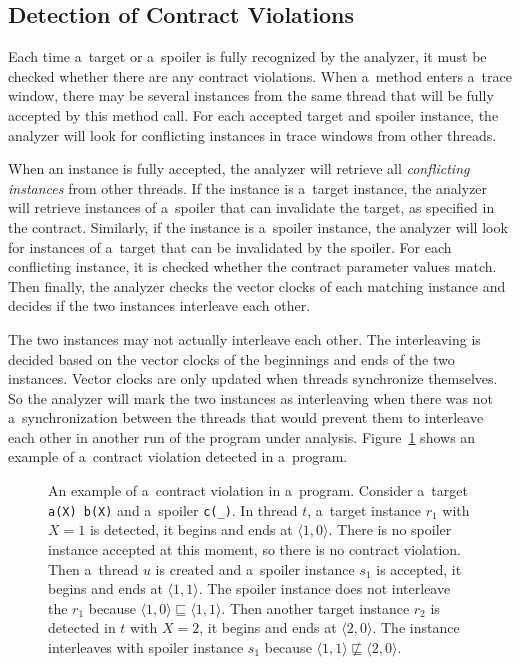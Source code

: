 \subsection{Detection of Contract Violations}
\label{violations}

Each time a~target or a~spoiler is fully recognized by the analyzer, it must be
checked whether there are any contract violations. When a~method enters a~trace
window, there may be several instances from the same thread that will be fully
accepted by this method call. For each accepted target and spoiler instance, the
analyzer will look for conflicting instances in trace windows from other
threads.

When an instance is fully accepted, the analyzer will retrieve all
\emph{conflicting instances} from other threads. If the instance is a~target
instance, the analyzer will retrieve instances of a~spoiler that can invalidate
the target, as specified in the contract. Similarly, if the instance is
a~spoiler instance, the analyzer will look for instances of a~target that can be
invalidated by the spoiler. For each conflicting instance, it is checked whether
the contract parameter values match. Then finally, the analyzer checks the
vector clocks of each matching instance and decides if the two instances
interleave each other.

The two instances may not actually interleave each other. The interleaving is
decided based on the vector clocks of the beginnings and ends of the two
instances. Vector clocks are only updated when threads synchronize themselves.
So the analyzer will mark the two instances as interleaving when there was not
a~synchronization between the threads that would prevent them to interleave each
other in another run of the program under analysis.
Figure~\ref{detectionExample} shows an example of a~contract violation detected
in a~program.

\begin{figure}[hbt]
    \begin{center}
        \label{detectionExample}
        
        \caption{An example of a~contract violation in a~program. Consider
        a~target \texttt{a(X) b(X)} and a~spoiler \texttt{c(\_)}. In thread $t$,
        a~target instance $r_1$ with $X=1$ is detected, it begins and ends at
        $\langle 1,0 \rangle$. There is no spoiler instance accepted at this
        moment, so there is no contract violation. Then a~thread $u$ is created
        and a~spoiler instance $s_1$ is accepted, it begins and ends at $\langle
        1,1 \rangle$. The spoiler instance does not interleave the $r_1$ because
        $\langle 1,0 \rangle \sqsubseteq \langle 1,1 \rangle$.  Then another
        target instance $r_2$ is detected in $t$ with $X=2$, it begins and ends
        at $\langle 2,0 \rangle$. The instance interleaves with spoiler instance
        $s_1$ because $\langle 1,1 \rangle \nsqsubseteq \langle 2,0 \rangle$.}
    \end{center}
\end{figure}

